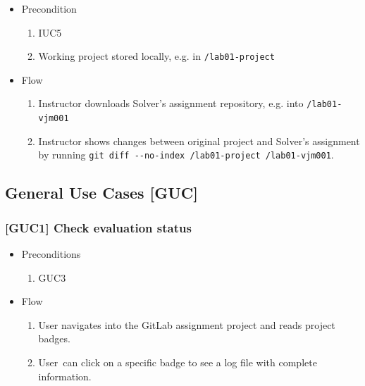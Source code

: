 \begin{itemize}
\item
  {Precondition}
    \begin{enumerate}
    \item
      {IUC5}
    \item
      {Working project stored locally, e.g. in \texttt{\textapprox/lab01-project}}
    \end{enumerate}
\end{itemize}

\begin{itemize}
\item
  {Flow}
    \begin{enumerate}
    \item
      {Instructor downloads Solver's assignment repository, e.g. into \texttt{\textapprox/lab01-vjm001}}
    \item
      {Instructor shows changes between original project and Solver's assignment by running \texttt{git diff -\/-no-index \textapprox/lab01-project \textapprox/lab01-vjm001}.}
    \end{enumerate}
\end{itemize}

\subsection{General Use Cases {[}GUC{]}} \label{ssec:guc}

\subsubsection{{[}GUC1{]} Check evaluation status}

\begin{itemize}
\item
  {Preconditions}
    \begin{enumerate}
    \item
      {GUC3}
    \end{enumerate}
\end{itemize}

\begin{itemize}
\item
  {Flow}
    \begin{enumerate}
    \item
      {User navigates into the GitLab assignment project and reads project badges.}
    \item
      {User}{~can click on a specific badge to see a log file with complete information.}
    \end{enumerate}
\end{itemize}


